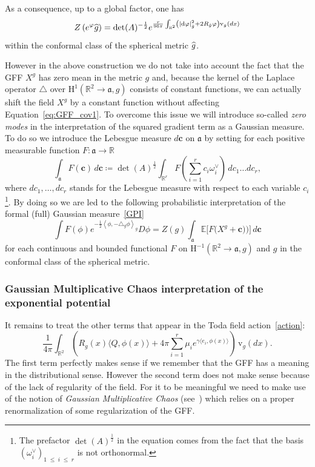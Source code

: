\documentclass[10pt]{amsart}
\theoremstyle{definition}\newtheorem{defi}[theo]{Definition}\newtheorem{rema}[theo]{Remark}\newtheorem{exam}[theo]{Example}\newtheorem{exem}[theo]{Example}\newtheorem{nota}[theo]{Notation}
\renewcommand{\leq}{\;\leqslant\;}
\newcommand{\dd}{\mathrm{d}}
\newcommand{\frka}{\mathfrak{a}}
\newcommand{\rmv}{\mathrm{v}}
\newcommand{\rmH}{\mathrm{H}}
\newcommand{\R}{\mathbb{R}}
\newcommand{\E}{\mathbb{E}}
\newcommand*\green[1]{#1}
\newcommand{\norm}[1]{\left\lvert#1\right\rvert}
\let\oldhat\hat
\renewcommand*{\hat}[1]{\mathchoice{\widehat{#1}}{\widehat{#1}}{\oldhat{#1}}{\oldhat{#1}}}
\begin{document}
As a consequence, up to a global factor, one has
\begin{equation}\label{reg_det}
Z\left(e^{\varphi}\hat g\right)=\det(A)^{-\frac12}e^{\frac{r}{96\pi}\int_{\R^2}\left(\norm{\dd \varphi}^2_{\hat g}+2R_{\hat g}\varphi\right)\rmv_{g}(dx)}
\end{equation}
within the conformal class of the spherical metric $\hat g$.

However in the above construction we do not take into account the fact that the GFF $X^g$ has zero mean in the metric $g$ and, because the kernel of the Laplace operator $\triangle$ over $\rmH^{1}(\R^2\to\frka,g)$ consists of constant functions, we can actually shift the field $X^g$ by a constant function without affecting Equation~\eqref{eq:GFF_cov1}. To overcome this issue we will introduce so-called\emph{ zero modes} in the interpretation of the squared gradient term as a Gaussian measure. To do so we introduce the Lebesgue measure $d\bm c$ on $\frka$ by setting for each positive measurable function $F:\frka\to\R$
\begin{equation}
\int_{\frka}F(\bm c)\,d\bm c\coloneqq \det(A)^{\frac12}\int_{\R^{r}}F\left(\sum_{i=1}^{r}c_i\omega_i^\vee\right)\,dc_1\dots dc_{r},
\end{equation}
where $dc_1,\dots, dc_{r}$ stands for the Lebesgue measure with respect to each variable $c_i$\footnote{The prefactor $\det(A)^{\frac12}$ in the equation comes from the fact that the basis $(\omega_i^\vee)_{1 \leq i \leq r}$ is not orthonormal.}. By doing so we are led to the following probabilistic interpretation of the formal (full) Gaussian measure~\eqref{GPI}
\begin{equation}\label{def:GPI}
\int F(\phi)e^{-\frac{1}{2}\left\langle \phi, -\triangle_{g} \phi \right\rangle_{g} }D\phi =Z(g) \int_{\frka}\E\Big[F\Big(X^g+\bm c)\Big)\Big]\,d\bm c
\end{equation}
for each continuous and bounded functional $F$ on $\rmH^{-1}(\R^2\to \frka,g)$ and $g$ in the conformal class of the spherical metric.

\subsubsection{Gaussian Multiplicative Chaos interpretation of the exponential potential}


It remains to treat the other terms that appear in the Toda field action~\eqref{action}:
\[
\frac{1}{4\pi} \int_{\R^2} \left(R_g(x) \langle Q, \green\phi(x) \rangle +4\pi \sum_{i=1}^{r} \mu_i e^{\gamma \langle e_i,\green\phi(x) \rangle} \right)\,\rmv_{g}(dx).
\]
The first term perfectly makes sense if we remember that the GFF has a meaning in the distributional sense. However the second term does not make sense because of the lack of regularity of the field. For it to be meaningful we need to make use of the notion of \emph{Gaussian Multiplicative Chaos} (see~\cite{Kah,review}) which relies on a proper renormalization of some regularization of the GFF.
\end{document}

